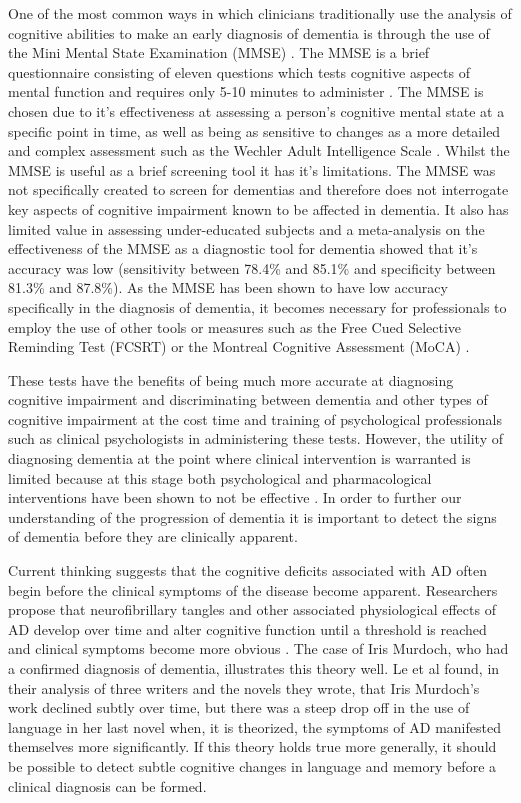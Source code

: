 One of the most common ways in which clinicians traditionally use the analysis of cognitive abilities to make an early diagnosis of dementia is through the use of the Mini Mental State Examination (MMSE) \cite{Folstein1975}. The MMSE is a brief questionnaire consisting of eleven questions which tests cognitive aspects of mental function and requires only 5-10 minutes to administer \cite{Folstein1975}. The MMSE is chosen due to it's effectiveness at assessing a person's cognitive mental state at a specific point in time, as well as being as sensitive to changes as a more detailed and complex assessment such as the Wechler Adult Intelligence Scale \cite{Folstein1975}. Whilst the MMSE is useful as a brief screening tool it has it's limitations. The MMSE was not specifically created to screen for dementias and therefore does not interrogate key aspects of cognitive impairment known to be affected in dementia. It also has limited value in assessing under-educated subjects and a meta-analysis on the effectiveness of the MMSE as a diagnostic tool for dementia showed that it's accuracy was low (sensitivity between 78.4\% and 85.1\% and specificity between 81.3\% and 87.8\%). As the MMSE has been shown to have low accuracy specifically in the diagnosis of dementia, it becomes necessary for professionals to employ the use of other tools or measures such as the Free Cued Selective Reminding Test (FCSRT) \cite{Grober2010} or the Montreal Cognitive Assessment (MoCA) \cite{Davis2015}.
\par 
These tests have the benefits of being much more accurate at diagnosing cognitive impairment and discriminating between dementia and other types of cognitive impairment at the cost time and training of psychological professionals such as clinical psychologists in administering these tests. However, the utility of diagnosing dementia at the point where clinical intervention is warranted is limited because at this stage both psychological and pharmacological interventions have been shown to not be effective \cite{Prince2015, Cummings2014}. In order to further our understanding of the progression of dementia it is important to detect the signs of dementia before they are clinically apparent.  
\par 
Current thinking suggests that the cognitive deficits associated with AD often begin before the clinical symptoms of the disease become apparent. Researchers propose that neurofibrillary tangles and other associated physiological effects of AD develop over time and alter cognitive function until a threshold is reached and clinical symptoms become more obvious \cite{Nestor2006}. The case of Iris Murdoch, who had a confirmed diagnosis of dementia, illustrates this theory well. Le et al \cite{Le2011} found, in their analysis of three writers and the novels they wrote, that Iris Murdoch's work declined subtly over time, but there was a steep drop off in the use of language in her last novel when, it is theorized, the symptoms of AD manifested themselves more significantly. If this theory holds true more generally, it should be possible to detect subtle cognitive changes in language and memory before a clinical diagnosis can be formed.
